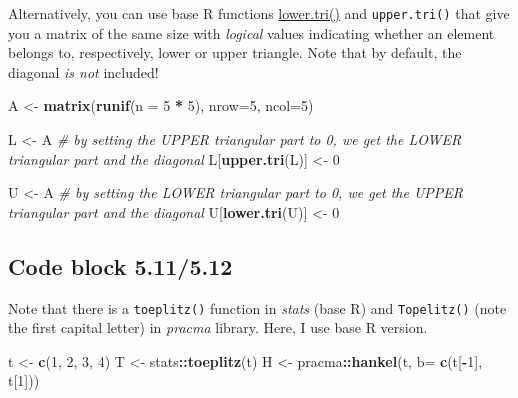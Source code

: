 \documentclass[
]{book}
\newenvironment{Shaded}{\begin{snugshade}}{\end{snugshade}}
\newcommand{\CommentTok}[1]{\textcolor[rgb]{0.56,0.35,0.01}{\textit{#1}}}
\newcommand{\DataTypeTok}[1]{\textcolor[rgb]{0.13,0.29,0.53}{#1}}
\newcommand{\DecValTok}[1]{\textcolor[rgb]{0.00,0.00,0.81}{#1}}
\newcommand{\KeywordTok}[1]{\textcolor[rgb]{0.13,0.29,0.53}{\textbf{#1}}}
\newcommand{\NormalTok}[1]{#1}
\newcommand{\OperatorTok}[1]{\textcolor[rgb]{0.81,0.36,0.00}{\textbf{#1}}}
\newcommand{\StringTok}[1]{\textcolor[rgb]{0.31,0.60,0.02}{#1}}
\begin{document}
Alternatively, you can use base R functions \href{https://stat.ethz.ch/R-manual/R-devel/library/base/html/lower.tri.html}{lower.tri()} and \texttt{upper.tri()} that give you a matrix of the same size with \emph{logical} values indicating whether an element belongs to, respectively, lower or upper triangle. Note that by default, the diagonal \emph{is not} included!

\begin{Shaded}
\begin{Highlighting}[]
\NormalTok{A \textless{}{-}}\StringTok{ }\KeywordTok{matrix}\NormalTok{(}\KeywordTok{runif}\NormalTok{(}\DataTypeTok{n =} \DecValTok{5} \OperatorTok{*}\StringTok{ }\DecValTok{5}\NormalTok{), }\DataTypeTok{nrow=}\DecValTok{5}\NormalTok{, }\DataTypeTok{ncol=}\DecValTok{5}\NormalTok{)}

\NormalTok{L \textless{}{-}}\StringTok{ }\NormalTok{A}
\CommentTok{\# by setting the UPPER triangular part to 0, we get the LOWER triangular part and the diagonal}
\NormalTok{L[}\KeywordTok{upper.tri}\NormalTok{(L)] \textless{}{-}}\StringTok{ }\DecValTok{0}

\NormalTok{U \textless{}{-}}\StringTok{ }\NormalTok{A}
\CommentTok{\# by setting the LOWER triangular part to 0, we get the UPPER triangular part and the diagonal}
\NormalTok{U[}\KeywordTok{lower.tri}\NormalTok{(U)] \textless{}{-}}\StringTok{ }\DecValTok{0}
\end{Highlighting}
\end{Shaded}

\hypertarget{code-block-5.115.12}{%
\subsection*{Code block 5.11/5.12}\label{code-block-5.115.12}}

Note that there is a \texttt{toeplitz()} function in \emph{stats} (base R) and \texttt{Topelitz()} (note the first capital letter) in \emph{pracma} library. Here, I use base R version.

\begin{Shaded}
\begin{Highlighting}[]
\NormalTok{t \textless{}{-}}\StringTok{ }\KeywordTok{c}\NormalTok{(}\DecValTok{1}\NormalTok{, }\DecValTok{2}\NormalTok{, }\DecValTok{3}\NormalTok{, }\DecValTok{4}\NormalTok{)}
\NormalTok{T \textless{}{-}}\StringTok{ }\NormalTok{stats}\OperatorTok{::}\KeywordTok{toeplitz}\NormalTok{(t)}
\NormalTok{H \textless{}{-}}\StringTok{ }\NormalTok{pracma}\OperatorTok{::}\KeywordTok{hankel}\NormalTok{(t, }\DataTypeTok{b=} \KeywordTok{c}\NormalTok{(t[}\OperatorTok{{-}}\DecValTok{1}\NormalTok{], t[}\DecValTok{1}\NormalTok{]))}
\end{Highlighting}
\end{Shaded}
\end{document}
